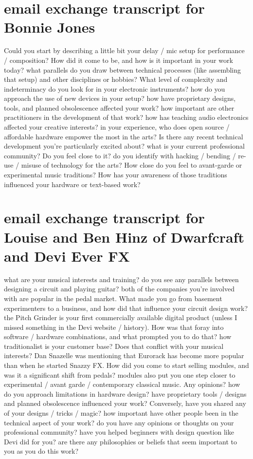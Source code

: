 \section{email exchange transcript for Bonnie Jones}

Could you start by describing a little bit your delay / mic setup for performance / composition? How did it come to be, and how is it important in your work today? 
what parallels do you draw between technical processes (like assembling that setup) and other disciplines or hobbies? 
What level of complexity and indeterminacy do you look for in your electronic instruments? 
how do you approach the use of new devices in your setup? 
how have proprietary designs, tools, and planned obsolescence affected your work? 
how important are other practitioners in the development of that work? 
how has teaching audio electronics affected your creative interests? 
in your experience, who does open source / affordable hardware empower the most in the arts? 
Is there any recent technical development you're particularly excited about? 
what is your current professional community? Do you feel close to it? 
do you identify with hacking / bending / re-use / misuse of technology for the arts? 
How close do you feel to avant-garde or experimental music traditions? 
How has your awareness of those traditions influenced your hardware or text-based work? 

\section{email exchange transcript for Louise and Ben Hinz of Dwarfcraft and Devi Ever FX}

what are your musical interests and training? 
do you see any parallels between designing a circuit and playing guitar?
both of the companies you're involved with are popular in the pedal market. What made you go from basement experimenters to a business, and how did that influence your circuit design work?
the Pitch Grinder is your first commercially available digital product (unless I missed something in the Devi website / history). How was that foray into software / hardware combinations, and what prompted you to do that? 
how traditionalist is your customer base? Does that conflict with your musical interests? 
Dan Snazelle was mentioning that Eurorack has become more popular than when he started Snazzy FX. How did you come to start selling modules, and was it a significant shift from pedals? 
modules also put you one step closer to experimental / avant garde / contemporary classical music. Any opinions? 
how do you approach limitations in hardware design? 
have proprietary tools / designs and planned obsolescence influenced your work? 
Conversely, have you shared any of your designs / tricks / magic? 
how important have other people been in the technical aspect of your work? 
do you have any opinions or thoughts on your professional community? 
have you helped beginners with design question like Devi did for you? 
are there any philosophies or beliefs that seem important to you as you do this work? 
